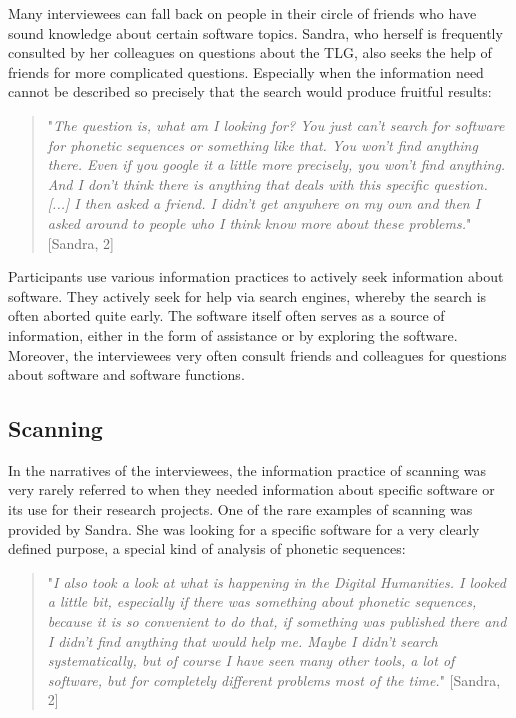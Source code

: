 \documentclass[12pt, a4paper, titlepage, oneside, abstract=true, toc=listof, toc=bibliography, BCOR=1cm]{scrreprt}
\begin{document}
{Many interviewees can fall back on people in their circle of friends who have sound knowledge about certain software topics. Sandra, who herself is frequently consulted by her colleagues on questions about the TLG, also seeks the help of friends for more complicated questions. Especially when the information need cannot be described so precisely that the search would produce fruitful results:

\begin{quotation}
"\textit{The question is, what am I looking for? You just can't search for software for phonetic sequences or something like that. You won't find anything there. Even if you google it a little more precisely, you won't find anything. And I don't think there is anything that deals with this specific question. [...] I then asked a friend. I didn't get anywhere on my own and then I asked around to people who I think know more about these problems.}" [Sandra, 2]
\end{quotation}

Participants use various information practices to actively seek information about software. They actively seek for help via search engines, whereby the search is often aborted quite early. The software itself often serves as a source of information, either in the form of assistance or by exploring the software. Moreover, the interviewees very often consult friends and colleagues for questions about software and software functions.

%
\subsection{Scanning}
\label{sec:IP_Scanning}
In the narratives of the interviewees, the information practice of scanning was very rarely referred to when they needed information about specific software or its use for their research projects. 
One of the rare examples of scanning was provided by Sandra. She was looking for a specific software for a very clearly defined purpose, a special kind of analysis of phonetic sequences:

\begin{quotation}
"\textit{I also took a look at what is happening in the Digital Humanities. I looked a little bit, especially if there was something about phonetic sequences, because it is so convenient to do that, if something was published there and I didn't find anything that would help me. Maybe I didn't search systematically, but of course I have seen many other tools, a lot of software, but for completely different problems most of the time.}" [Sandra, 2]
\end{quotation}

}
\end{document}
